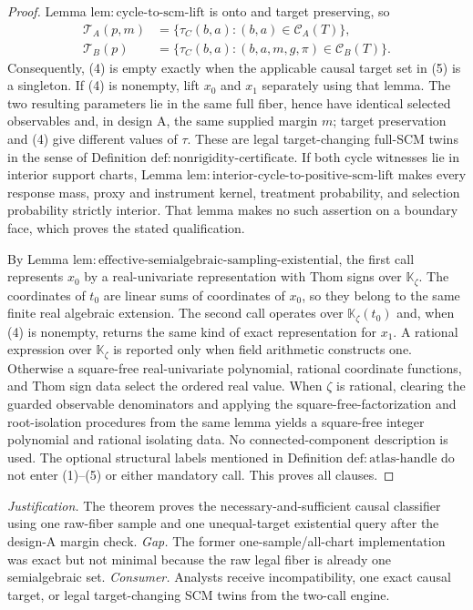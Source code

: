 \documentclass{article}
\begin{document}
\begin{proof}
Lemma \(\mathrm{lem{:}cycle\text{-}to\text{-}scm\text{-}lift}\) is onto and target preserving, so
\[
 \begin{aligned}
 \mathcal T_A(p,m)
  &=\{\tau_C(b,a):(b,a)\in\mathcal C_A(T)\},\\
 \mathcal T_B(p)
  &=\{\tau_C(b,a):(b,a,m,g,\pi)\in\mathcal C_B(T)\}.
 \end{aligned}                                             \tag{5}
\]
Consequently, (4) is empty exactly when the applicable causal target set in (5) is a singleton.  If (4) is nonempty, lift \(x_0\) and \(x_1\) separately using that lemma.  The two resulting parameters lie in the same full fiber, hence have identical selected observables and, in design A, the same supplied margin \(m\); target preservation and (4) give different values of \(\tau\).  These are legal target-changing full-SCM twins in the sense of Definition \(\mathrm{def{:}nonrigidity\text{-}certificate}\).  If both cycle witnesses lie in interior support charts, Lemma \(\mathrm{lem{:}interior\text{-}cycle\text{-}to\text{-}positive\text{-}scm\text{-}lift}\) makes every response mass, proxy and instrument kernel, treatment probability, and selection probability strictly interior.  That lemma makes no such assertion on a boundary face, which proves the stated qualification.

By Lemma \(\mathrm{lem{:}effective\text{-}semialgebraic\text{-}sampling\text{-}existential}\), the first call represents \(x_0\) by a real-univariate representation with Thom signs over \(\mathbb K_{\zeta}\).  The coordinates of \(t_0\) are linear sums of coordinates of \(x_0\), so they belong to the same finite real algebraic extension.  The second call operates over \(\mathbb K_{\zeta}(t_0)\) and, when (4) is nonempty, returns the same kind of exact representation for \(x_1\).  A rational expression over \(\mathbb K_{\zeta}\) is reported only when field arithmetic constructs one.  Otherwise a square-free real-univariate polynomial, rational coordinate functions, and Thom sign data select the ordered real value.  When \(\zeta\) is rational, clearing the guarded observable denominators and applying the square-free-factorization and root-isolation procedures from the same lemma yields a square-free integer polynomial and rational isolating data.  No connected-component description is used.  The optional structural labels mentioned in Definition \(\mathrm{def{:}atlas\text{-}handle}\) do not enter (1)--(5) or either mandatory call.  This proves all clauses.
\end{proof}
\par\smallskip\noindent \textit{Justification.} The theorem proves the necessary-and-sufficient causal classifier using one raw-fiber sample and one unequal-target existential query after the design-A margin check. \textit{Gap.} The former one-sample/all-chart implementation was exact but not minimal because the raw legal fiber is already one semialgebraic set. \textit{Consumer.} Analysts receive incompatibility, one exact causal target, or legal target-changing SCM twins from the two-call engine.
\end{document}

